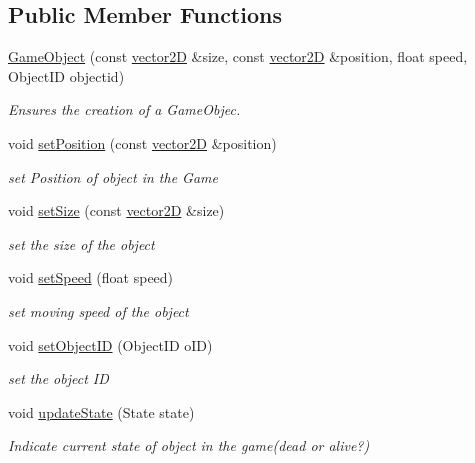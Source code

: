 \subsection*{Public Member Functions}
\begin{DoxyCompactItemize}
\item 
\mbox{\hyperlink{class_game_object_aeff3db3107cbe82af96169ed5b69c09e}{Game\+Object}} (const \mbox{\hyperlink{classvector2_d}{vector2D}} \&size, const \mbox{\hyperlink{classvector2_d}{vector2D}} \&position, float speed, Object\+ID objectid)
\begin{DoxyCompactList}\small\item\em Ensures the creation of a Game\+Objec. \end{DoxyCompactList}\item 
void \mbox{\hyperlink{class_game_object_aa8b57a053c1fee8d3d14912dd9e320c8}{set\+Position}} (const \mbox{\hyperlink{classvector2_d}{vector2D}} \&position)
\begin{DoxyCompactList}\small\item\em set Position of object in the Game \end{DoxyCompactList}\item 
void \mbox{\hyperlink{class_game_object_aeb29555a9bb5cebab57da1960a5085f1}{set\+Size}} (const \mbox{\hyperlink{classvector2_d}{vector2D}} \&size)
\begin{DoxyCompactList}\small\item\em set the size of the object \end{DoxyCompactList}\item 
void \mbox{\hyperlink{class_game_object_a80309e81b799b423a25e180044207114}{set\+Speed}} (float speed)
\begin{DoxyCompactList}\small\item\em set moving speed of the object \end{DoxyCompactList}\item 
void \mbox{\hyperlink{class_game_object_a2ba7a56d4fa8a002fb150989287d6b43}{set\+Object\+ID}} (Object\+ID o\+ID)
\begin{DoxyCompactList}\small\item\em set the object ID \end{DoxyCompactList}\item 
void \mbox{\hyperlink{class_game_object_a77c7875aa47e873967324113060ed2e9}{update\+State}} (State state)
\begin{DoxyCompactList}\small\item\em Indicate current state of object in the game(dead or alive?) \end{DoxyCompactList}\item 

\end{DoxyCompactItemize}
